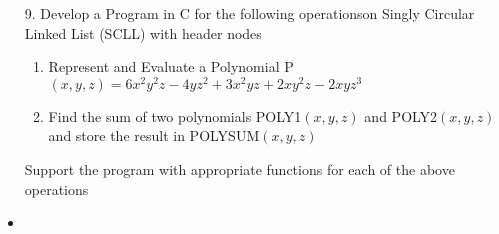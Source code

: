 \documentclass{article}
\newcommand{\answer}{\item [$\rightarrow$]}
\begin{document}
	\begin{itemize}
		\item [9.] Develop a Program in C for the following operationson Singly Circular Linked List (SCLL) with header nodes

		\begin{enumerate}[label=\alph*.]
			\item Represent and Evaluate a Polynomial P$(x,y,z)=6x^2y^2z-4yz^2+3x^2yz+2xy^2z-2xyz^3$
			\item Find the sum of two polynomials POLY1$(x,y,z)$ and POLY2$(x,y,z)$ and store the result in POLYSUM$(x,y,z)$
		\end{enumerate}
		Support the program with appropriate functions for each of the above operations

		\answer \inputminted{c}{../../Program9.c}
	\end{itemize}
\end{document}

